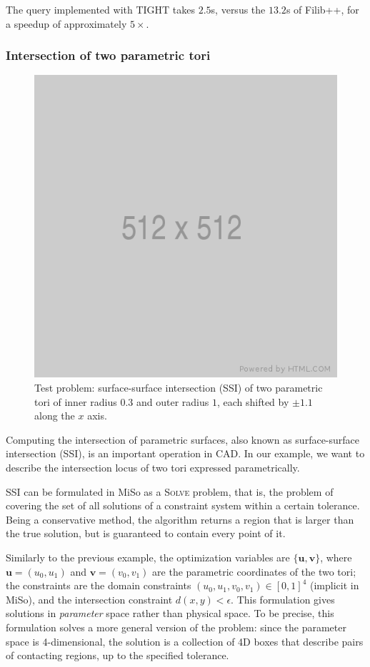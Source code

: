 The query implemented with TIGHT takes $2.5$s, versus the $13.2$s of Filib++, for a speedup of approximately $5\times$.

\subsubsection{Intersection of two parametric tori}
\begin{figure}
	\includegraphics[width=0.4\linewidth]{fig/512x512.png}
	\centering
	\caption{Test problem: surface-surface intersection (SSI) of two parametric tori of inner radius $0.3$ and outer radius $1$, each shifted by $\pm1.1$ along the $x$ axis.}
	\label{fig:tori}
\end{figure}
Computing the intersection of parametric surfaces, also known as surface-surface intersection (SSI), is an important operation in CAD.
In our example, we want to describe the intersection locus of two tori expressed parametrically.

SSI can be formulated in MiSo as a \textsc{Solve} problem, that is, the problem of covering the set of all solutions of a constraint system within a certain tolerance.
Being a conservative method, the algorithm returns a region that is larger than the true solution, but is guaranteed to contain every point of it.

Similarly to the previous example, the optimization variables are $\{\mathbf{u}, \mathbf{v}\}$, where $\mathbf{u}=(u_0, u_1)$ and $\mathbf{v}=(v_0, v_1)$ are the parametric coordinates of the two tori;
the constraints are the domain constraints $(u_0,u_1,v_0,v_1)\in[0,1]^4$ (implicit in MiSo), and the intersection constraint $d(x,y)<\epsilon$.
This formulation gives solutions in \emph{parameter} space rather than physical space. To be precise, this formulation solves a more general version of the problem: since the parameter space is 4-dimensional, the solution is a collection of 4D boxes that describe pairs of contacting regions, up to the specified tolerance.

